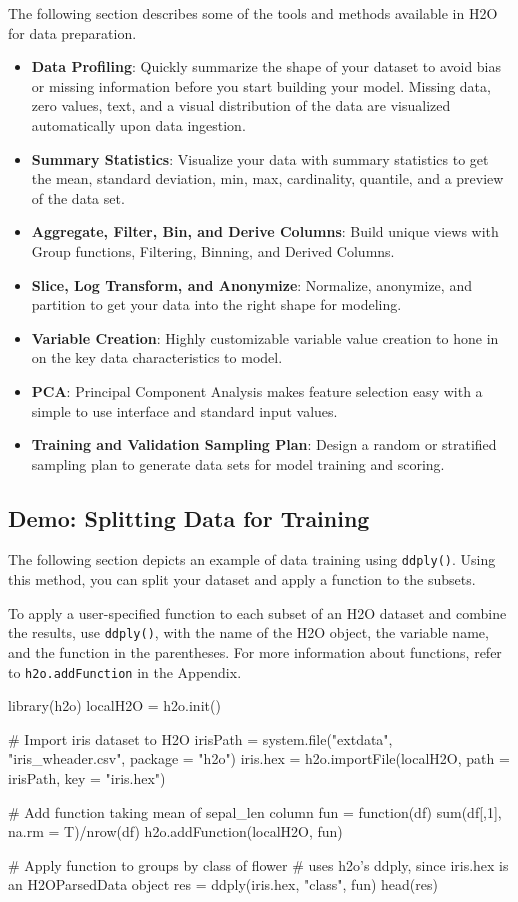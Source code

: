 \documentclass[11pt]{article}
\begin{document}
The following section describes some of the tools and methods available in H2O for data preparation. 
\begin{itemize}
\item {\textbf{Data Profiling}}: Quickly summarize the shape of your dataset to avoid bias or missing information before you start building your model. Missing data, zero values, text, and a visual distribution of the data are visualized automatically upon data ingestion. 
\item {\textbf{Summary Statistics}}: Visualize your data with summary statistics to get the mean, standard deviation, min, max, cardinality, quantile, and a preview of the data set. 
\item {\textbf{Aggregate, Filter, Bin, and Derive Columns}}: Build unique views with Group functions, Filtering, Binning, and Derived Columns. 
\item {\textbf{Slice, Log Transform, and Anonymize}}: Normalize, anonymize, and partition to get your data into the right shape for modeling. 
\item {\textbf{Variable Creation}}: Highly customizable variable value creation to hone in on the key data characteristics to model. 
\item {\textbf{PCA}}: Principal Component Analysis makes feature selection easy with a simple to use interface and standard input values. 
\item {\textbf{Training and Validation Sampling Plan}}: Design a random or stratified sampling plan to generate data sets for model training and scoring. 
\end{itemize}

\subsection{Demo: Splitting Data for Training}

The following section depicts an example of data training using {\texttt{ddply()}}. Using this method, you can split your dataset and apply a function to the subsets.

To apply a user-specified function to each subset of an H2O dataset and combine the results, use {\texttt{ddply()}}, with the name of the H2O object, the variable name, and the function in the parentheses. For more information about functions, refer to {\texttt{h2o.addFunction}} in the Appendix.

\begin{spverbatim}
library(h2o)
localH2O = h2o.init()

# Import iris dataset to H2O
irisPath = system.file("extdata", "iris_wheader.csv", package = "h2o")
iris.hex = h2o.importFile(localH2O, path = irisPath, key = "iris.hex")

# Add function taking mean of sepal_len column
fun = function(df) { sum(df[,1], na.rm = T)/nrow(df) }
h2o.addFunction(localH2O, fun)

# Apply function to groups by class of flower
# uses h2o's ddply, since iris.hex is an H2OParsedData object
res = ddply(iris.hex, "class", fun)
head(res)
\end{spverbatim}
\end{document}
